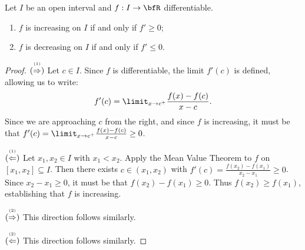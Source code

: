     \begin{theorem}
        Let $I$ be an open interval and $f:I \rightarrow \bfR$ differentiable.
            \begin{enumerate}[label = (\arabic*)]
                \item $f$ is increasing on $I$ if and only if $f' \geq 0$;
                \item $f$ is decreasing on $I$ if and only if $f' \leq 0$.
            \end{enumerate}
    \end{theorem}
        \begin{proof}
            $\stackrel{\text{\tiny (1)}}{(\Rightarrow)}$ Let $c \in I$. Since $f$ is differentiable, the limit $f'(c)$ is defined, allowing us to write:
                \begin{equation*}
                \begin{split}
                    f'(c) = \limit_{x \rightarrow c^+}\frac{f(x) - f(c)}{x-c}.
                \end{split}
                \end{equation*}
            Since we are approaching $c$ from the right, and since $f$ is increasing, it must be that $f'(c) = \limit_{x \rightarrow c^+}\frac{f(x) - f(c)}{x-c} \geq 0$. \nl

            $\stackrel{\text{\tiny (1)}}{(\Leftarrow)}$ Let $x_1,x_2 \in I$ with $x_1 < x_2$. Apply the Mean Value Theorem to $f$ on $[x_1,x_2] \subseteq I$. Then there exists $c \in (x_1,x_2)$ with $f'(c) = \frac{f(x_2) - f(x_1)}{x_2 - x_1} \geq 0$. Since $x_2 - x_1 \geq 0$, it must be that $f(x_2) - f(x_1) \geq 0$. Thus $f(x_2) \geq f(x_1)$, establishing that $f$ is increasing. \nl
            
            $\stackrel{\text{\tiny (2)}}{(\Rightarrow)}$ This direction follows similarly. \nl
            
            $\stackrel{\text{\tiny (2)}}{(\Leftarrow)}$ This direction follows similarly.
        \end{proof}

